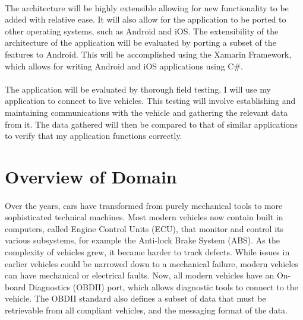 \documentclass[12pt]{report}
\begin{document}
			\paragraph{}
			{
			The architecture will be highly extensible allowing for new functionality to be added with relative ease. It will also allow for the application to be ported to other operating systems, such as Android and iOS. The extensibility of the architecture of the application will be evaluated by porting a subset of the features to Android. This will be accomplished using the Xamarin Framework, which allows for writing Android and iOS applications using C{\#}.
			}
			\paragraph{}
			{
			The application will be evaluated by thorough field testing. I will use my application to connect to live vehicles. This testing will involve establishing and maintaining communications with the vehicle and gathering the relevant data from it. The data gathered will then be compared to that of similar applications to verify that my application functions correctly.
			}
		\section{Overview of Domain}
			\paragraph{}{
			Over the years, cars have transformed from purely mechanical tools to more sophisticated technical machines. Most modern vehicles now contain built in computers, called Engine Control Units (ECU), that monitor and control its various subsystems, for example the Anti-lock Brake System (ABS). As the complexity of vehicles grew, it became harder to track defects. While issues in earlier vehicles could be narrowed down to a mechanical failure, modern vehicles can have mechanical or electrical faults. Now, all modern vehicles have an On-board Diagnostics (OBDII) port, which allows diagnostic tools to connect to the vehicle. The OBDII standard also defines a subset of data that must be retrievable from all compliant vehicles, and the messaging format of the data.
			 
			}
\end{document}
